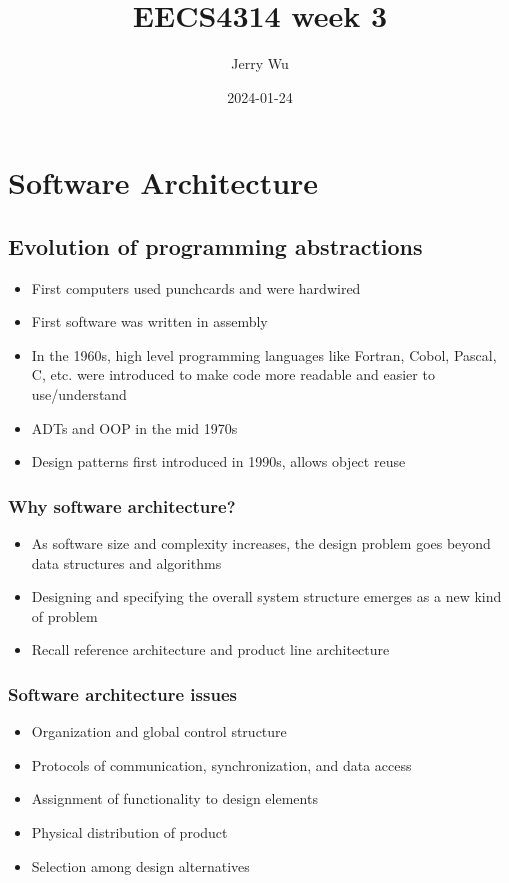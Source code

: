 \documentclass[12pt]{book}
\title{EECS4314 week 3}
\author{Jerry Wu}
\date{2024-01-24}
\begin{document}
\maketitle
\tableofcontents

\chapter{Software Architecture}

\section*{Evolution of programming abstractions}

\begin{itemize}
    \item First computers used punchcards and were hardwired
    \item First software was written in assembly
    \item In the 1960s, high level programming languages like Fortran, Cobol, Pascal, C, etc. were introduced to make code more readable and easier to use/understand
    \item ADTs and OOP in the mid 1970s
    \item Design patterns first introduced in 1990s, allows object reuse
\end{itemize}

\subsection*{Why software architecture?}
\begin{itemize}
    \item As software size and complexity increases, the design problem goes beyond data structures and algorithms
    \item Designing and specifying the overall system structure emerges as a new kind of problem
    \item Recall reference architecture and product line architecture
\end{itemize}

\subsection*{Software architecture issues}
\begin{itemize}
    \item Organization and global control structure
    \item Protocols of communication, synchronization, and data access
    \item Assignment of functionality to design elements
    \item Physical distribution of product
    \item Selection among design alternatives
\end{itemize}
\end{document}
